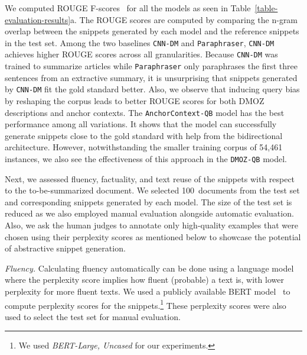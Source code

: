 \documentclass[sigconf]{acmart}
\newcommand{\bslabel}[1]{\textsl{#1.}}
\begin{document}
We computed ROUGE F-scores~\cite{lin:2004} for all the models as seen in Table~\ref{table-evaluation-results}a. The ROUGE scores are computed by comparing the n-gram overlap between the snippets generated by each model and the reference snippets in the test set. Among the two baselines {\small\tt CNN-DM} and {\small\tt Paraphraser}, {\small\tt CNN-DM} achieves higher ROUGE scores across all granularities. Because {\small\tt CNN-DM} was trained to summarize articles while {\small\tt Paraphraser} only paraphrases the first three sentences from an extractive summary, it is unsurprising that snippets generated by {\small\tt CNN-DM} fit the gold standard better. Also, we observe that inducing query bias by reshaping the corpus leads to better ROUGE scores for both DMOZ descriptions and anchor contexts. The {\small\tt AnchorContext-QB} model has the best performance among all variations. It shows that the model can successfully generate snippets close to the gold standard with help from the bidirectional architecture. However, notwithstanding the smaller training corpus of 54,461 instances, we also see the effectiveness of this approach in the {\small\tt DMOZ-QB} model.

Next, we assessed fluency, factuality, and text reuse of the snippets with respect to the to-be-summarized document. We selected 100~documents from the test set and corresponding snippets generated by each model. The size of the test set is reduced as we also employed manual evaluation alongside automatic evaluation. Also, we ask the human judges to annotate only high-quality examples that were chosen using their perplexity scores as mentioned below to showcase the potential of abstractive snippet generation.

\bslabel{Fluency}
Calculating fluency automatically can be done using a language model where the perplexity score implies how fluent (probable) a text is, with lower perplexity for more fluent texts. We used a publicly available BERT model~\cite{devlin:2019} to compute perplexity scores for the snippets.\footnote{We used \emph{BERT-Large, Uncased} for our experiments.}
These perplexity scores were also used to select the test set for manual evaluation. 
\end{document}

